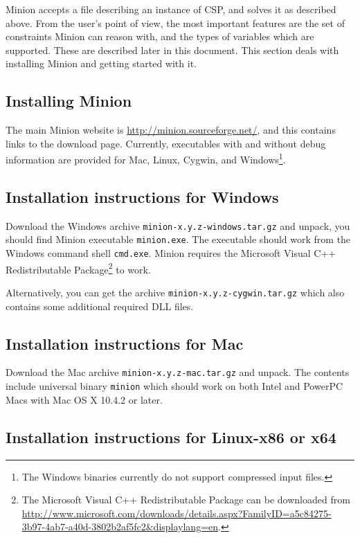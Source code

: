 \documentclass[oneside]{book}
\begin{document}
Minion accepts a file describing an instance of CSP, and solves it
as described above. From the user's point of view, the most important
features are the set of constraints Minion can reason with, and the
types of variables which are supported. These are described later
in this document. This section deals with installing Minion and getting
started with it.


\subsection{Installing Minion}

The main Minion website is \url{http://minion.sourceforge.net/},
and this contains links to the download page. Currently, executables with and
without debug information are provided for Mac, Linux, Cygwin, and
Windows\footnote{The Windows binaries currently do not support compressed input
files.}.


\subsection{Installation instructions for Windows}

Download the Windows archive \texttt{minion-x.y.z-windows.tar.gz} and unpack,
you should find Minion executable \texttt{minion.exe}. The executable should
work from the Windows command shell \texttt{cmd.exe}. Minion requires the
Microsoft Visual C++ Redistributable Package\footnote{The Microsoft Visual C++
Redistributable Package can be downloaded from
\url{http://www.microsoft.com/downloads/details.aspx?FamilyID=a5c84275-3b97-4ab7-a40d-3802b2af5fc2&displaylang=en}.} to work.

Alternatively, you can get the archive \texttt{minion-x.y.z-cygwin.tar.gz} which
also contains some additional required DLL files.


\subsection{Installation instructions for Mac}

Download the Mac archive \texttt{minion-x.y.z-mac.tar.gz} and unpack. The contents
include universal binary \texttt{minion} which should work on both Intel and PowerPC
Macs with Mac OS X 10.4.2 or later.


\subsection{Installation instructions for Linux-x86 or x64}
\end{document}
